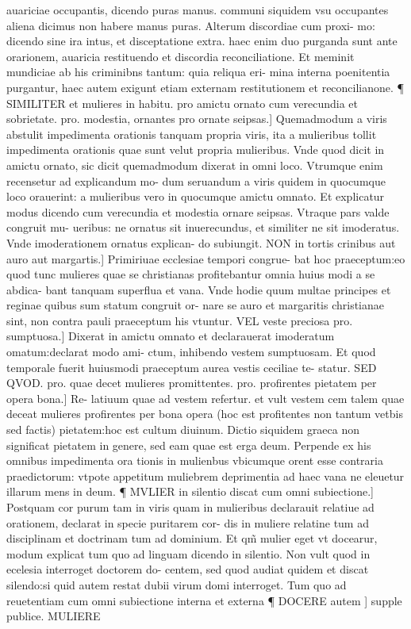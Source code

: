 \documentclass{article}
\begin{document}
\begin{pages}
auariciae occupantis, dicendo puras manus. communi siquidem vsu occupantes aliena dicimus non habere manus puras. Alterum discordiae cum proxi- mo: dicendo sine ira  intus, et disceptatione extra. haec enim duo purganda sunt ante orarionem, auaricia restituendo et discordia reconciliatione. Et meminit mundiciae ab his criminibns tantum: quia reliqua eri- mina interna poenitentia purgantur, haec autem exigunt etiam externam restitutionem et reconcilianone. ¶ SIMILITER et mulieres in habitu. pro amictu  ornato cum verecundia et sobrietate. pro. modestia, ornantes pro ornate  seipsas.] Quemadmodum a viris abstulit impedimenta orationis tanquam propria viris, ita a mulieribus tollit impedimenta orationis quae sunt velut propria mulieribus. Vnde quod dicit in amictu ornato, sic dicit quemadmodum dixerat in omni loco. Vtrumque  enim recensetur ad explicandum mo- dum seruandum  a viris quidem in quocumque  loco orauerint: a mulieribus vero in quocumque  amictu omnato. Et explicatur modus dicendo cum verecundia et modestia ornare seipsas. Vtraque  pars valde congruit mu- ueribus: ne ornatus sit inuerecundus, et similiter ne sit imoderatus. Vnde imoderationem ornatus explican- do subiungit. NON in tortis crinibus aut auro aut margartis.] Primiriuae ecclesiae tempori congrue- bat hoc praeceptum:eo quod tunc mulieres quae se christianas profitebantur  omnia huius modi a se abdica- bant tanquam superflua et vana. Vnde hodie quum multae principes et reginae quibus sum statum congruit or- nare se auro et margaritis  christianae sint, non contra pauli praeceptum his vtuntur. VEL veste preciosa pro. sumptuosa.] Dixerat in amictu omnato  et declarauerat imoderatum omatum:declarat modo ami- ctum, inhibendo vestem sumptuosam. Et quod temporale fuerit huiusmodi praeceptum  aurea vestis ceciliae te- statur. SED QVOD. pro. quae  decet mulieres promittentes. pro. profirentes  pietatem per opera bona.] Re- latiuum quae ad vestem refertur. et vult vestem cem talem quae deceat mulieres profirentes per bona opera (hoc est profitentes non tantum vetbis sed factis) pietatem:hoc est cultum diuinum. Dictio siquidem graeca non significat pietatem in genere, sed eam quae est erga deum. Perpende ex his omnibus impedimenta ora tionis in mulienbus vbicumque  orent esse contraria praedictorum: vtpote appetitum muliebrem deprimentia ad haec vana ne eleuetur illarum mens in deum. ¶ MVLIER in silentio discat cum omni subiectione.] Postquam cor purum tam in viris quam in mulieribus declarauit relatiue ad orationem, declarat in specie puritarem cor- dis in muliere relatine tum ad disciplinam et doctrinam  tum ad dominium. Et qm̃ mulier eget vt docearur, modum explicat tum quo ad linguam  dicendo in silentio. Non vult quod in ecelesia interroget doctorem do- centem, sed quod audiat quidem et discat silendo:si quid autem restat dubii  virum domi interroget. Tum quo ad reuetentiam cum omni subiectione  interna et externa ¶ DOCERE autem ] supple publice. MULIERE  \pend

\end{pages}
\end{document}
